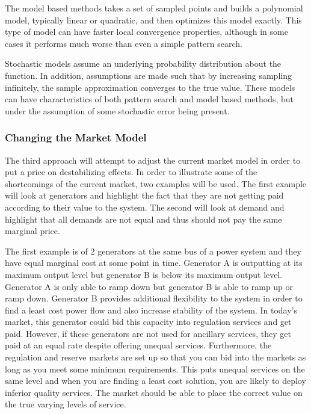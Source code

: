 \documentclass[class=report]{standalone}
\begin{document}
  The model based methods takes a set of sampled points and builds a polynomial model, typically linear or quadratic, and then optimizes this model exactly.  This type of model can have faster local convergence properties, although in some cases it performs much worse than even a simple pattern search.

Stochastic models assume an underlying probability distribution about the function.  In addition, assumptions are made such that by increasing sampling infinitely, the sample approximation converges to the true value.  These models can have characteristics of both pattern search and model based methods, but under the assumption of some stochastic error being present.

\subsubsection{Changing the Market Model}
The third approach will attempt to adjust the current market model in order to put a price on destabilizing effects.  In order to illustrate some of the shortcomings of the current market, two examples will be used.  The first example will look at generators and highlight the fact that they are not getting paid according to their value to the system.  The second will look at demand and highlight that all demands are not equal and thus should not pay the same marginal price.

The first example is of 2 generators at the same bus of a power system and they have equal marginal cost at some point in time.  Generator A is outputting at its maximum output level but generator B is below its maximum output level.  Generator A is only able to ramp down but generator B is able to ramp up or ramp down.  Generator B provides additional flexibility to the system in order to find a least cost power flow and also increase stability of the system.  In today's market, this generator could bid this capacity into regulation services and get paid.  However, if these generators are not used for ancillary services, they get paid at an equal rate despite offering unequal services.   Furthermore, the regulation and reserve markets are set up so that you can bid into the markets as long as you meet some minimum requirements.  This puts unequal services on the same level and when you are finding a least cost solution, you are likely to deploy inferior quality services.  The market should be able to place the correct value on the true varying levels of service.
\end{document}
